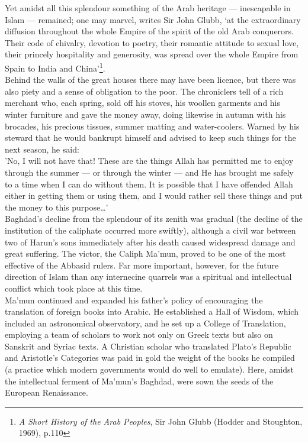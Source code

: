 \documentclass[10pt, twoside]{book}
\begin{document}
Yet amidst all this splendour something of the Arab heritage --- inescapable in Islam --- remained; one 
may marvel, writes Sir John Glubb, `at the extraordinary diffusion throughout the whole Empire of the 
spirit of the old Arab conquerors. Their code of chivalry, devotion to poetry, their romantic 
attitude to sexual love, their princely hospitality and generosity, was spread over the whole Empire 
from Spain to India and China'\footnote{\emph{A Short History of the Arab Peoples}, Sir John Glubb (Hodder and Stoughton, 1969), p.110}. \\

Behind the walls of the great houses there may have been licence, but there was also piety and a 
sense of obligation to the poor. The chroniclers tell of a rich merchant who, each spring, sold off 
his stoves, his woollen garments and his winter furniture and gave the money away, doing likewise in 
autumn with his brocades, his precious tissues, summer matting and water\hyp{}coolers. Warned by his 
steward that he would bankrupt himself and advised to keep such things for the next season, he said: \\

'No, I will not have that! These are the things Allah has permitted me to enjoy through the summer --- 
or through the winter --- and He has brought me safely to a time when I can do without them. It is 
possible that I have offended Allah either in getting them or using them, and I would rather sell 
these things and put the money to this purpose\ldots{}' \\

Baghdad's decline from the splendour of its zenith was gradual (the decline of the institution of the 
caliphate occurred more swiftly), although a civil war between two of Harun's sons immediately after 
his death caused widespread damage and great suffering. The victor, the Caliph Ma'mun, proved to be 
one of the most effective of the Abbasid rulers. Far more important, however, for the future 
direction of Islam than any internecine quarrels was a spiritual and intellectual conflict which took 
place at this time. \\

Ma'mun continued and expanded his father's policy of encouraging the translation of foreign books 
into Arabic. He established a Hall of Wisdom, which included an astronomical observatory, and he set 
up a College of Translation, employing a team of scholars to work not only on Greek texts but also on 
Sanskrit and Syriac texts. A Christian scholar who translated Plato's Republic and Aristotle's 
Categories was paid in gold the weight of the books he compiled (a practice which modern governments 
would do well to emulate). Here, amidst the intellectual ferment of Ma'mun's Baghdad, were sown the 
seeds of the European Renaissance. \\
\end{document}
